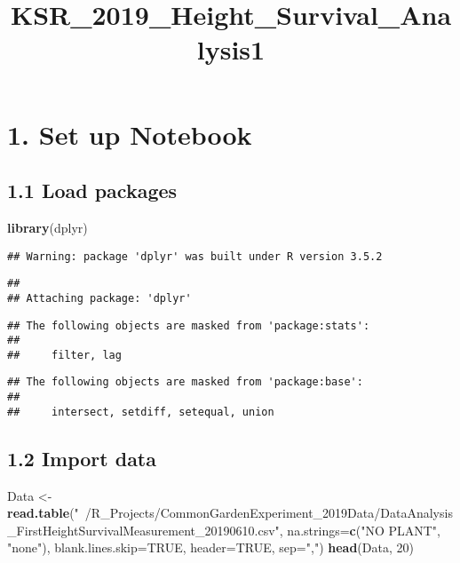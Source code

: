 \documentclass[]{article}
\title{KSR\_2019\_Height\_Survival\_Analysis1}
\author{}
\date{}
\newenvironment{Shaded}{\begin{snugshade}}{\end{snugshade}}
\newcommand{\KeywordTok}[1]{\textcolor[rgb]{0.13,0.29,0.53}{\textbf{#1}}}
\newcommand{\DataTypeTok}[1]{\textcolor[rgb]{0.13,0.29,0.53}{#1}}
\newcommand{\DecValTok}[1]{\textcolor[rgb]{0.00,0.00,0.81}{#1}}
\newcommand{\StringTok}[1]{\textcolor[rgb]{0.31,0.60,0.02}{#1}}
\newcommand{\OtherTok}[1]{\textcolor[rgb]{0.56,0.35,0.01}{#1}}
\newcommand{\NormalTok}[1]{#1}
\begin{document}
\maketitle

{
\setcounter{tocdepth}{3}
\tableofcontents
}
\section{1. Set up Notebook}\label{set-up-notebook}

\subsection{1.1 Load packages}\label{load-packages}

\begin{Shaded}
\begin{Highlighting}[]
\KeywordTok{library}\NormalTok{(dplyr)}
\end{Highlighting}
\end{Shaded}

\begin{verbatim}
## Warning: package 'dplyr' was built under R version 3.5.2
\end{verbatim}

\begin{verbatim}
## 
## Attaching package: 'dplyr'
\end{verbatim}

\begin{verbatim}
## The following objects are masked from 'package:stats':
## 
##     filter, lag
\end{verbatim}

\begin{verbatim}
## The following objects are masked from 'package:base':
## 
##     intersect, setdiff, setequal, union
\end{verbatim}

\subsection{1.2 Import data}\label{import-data}

\begin{Shaded}
\begin{Highlighting}[]
\NormalTok{Data <-}\StringTok{ }\KeywordTok{read.table}\NormalTok{(}\StringTok{"~/R_Projects/CommonGardenExperiment_2019Data/DataAnalysis_FirstHeightSurvivalMeasurement_20190610.csv"}\NormalTok{, }\DataTypeTok{na.strings=}\KeywordTok{c}\NormalTok{(}\StringTok{"NO PLANT"}\NormalTok{, }\StringTok{"none"}\NormalTok{), }\DataTypeTok{blank.lines.skip=}\OtherTok{TRUE}\NormalTok{, }\DataTypeTok{header=}\OtherTok{TRUE}\NormalTok{, }\DataTypeTok{sep=}\StringTok{","}\NormalTok{)}
\KeywordTok{head}\NormalTok{(Data, }\DecValTok{20}\NormalTok{)}
\end{Highlighting}
\end{Shaded}
\end{document}
